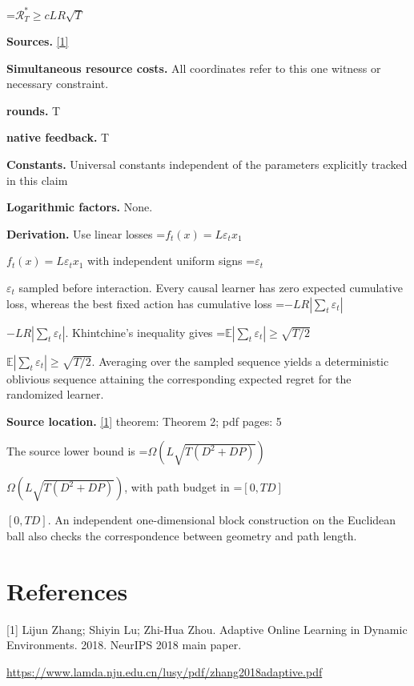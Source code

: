 \documentclass[10pt,a4paper]{article}
\newcommand{\AtlasMath}[1]{\par\begingroup\centering\setbox0=\hbox{$\displaystyle #1$}\ifdim\wd0>1.4\linewidth\typeout{ATLAS WIDE FORMULA: \the\wd0}\fi\ifdim\wd0>\linewidth\resizebox{\linewidth}{!}{\box0}\else\box0\fi\par\endgroup}
\newcommand{\AtlasInlineMath}[1]{\begingroup\setbox0=\hbox{$#1$}\ifdim\wd0>.4\linewidth\endgroup\AtlasMath{#1}\else\endgroup$#1$\fi}
\begin{document}
\AtlasMath{\mathcal{R}_T^*\ge cLR\sqrt T}
\textbf{Sources.} \href{https://www.lamda.nju.edu.cn/lusy/pdf/zhang2018adaptive.pdf}{[1]}

\textbf{Simultaneous resource costs.} All coordinates refer to this one witness or necessary constraint.

\textbf{rounds.} T

\textbf{native feedback.} T

\textbf{Constants.} Universal constants independent of the parameters explicitly tracked in this claim

\textbf{Logarithmic factors.} None.

\textbf{Derivation.} Use linear losses \AtlasInlineMath{f_t(x)=L\varepsilon_t x_1} with independent uniform signs \AtlasInlineMath{\varepsilon_t} sampled before interaction. Every causal learner has zero expected cumulative loss, whereas the best fixed action has cumulative loss \AtlasInlineMath{-LR|\sum_t\varepsilon_t|}. Khintchine's inequality gives \AtlasInlineMath{\mathbb E|\sum_t\varepsilon_t|\ge\sqrt{T/2}}. Averaging over the sampled sequence yields a deterministic oblivious sequence attaining the corresponding expected regret for the randomized learner.

\textbf{Source location.} \href{https://www.lamda.nju.edu.cn/lusy/pdf/zhang2018adaptive.pdf}{[1]} theorem: Theorem 2; pdf pages: 5

The source lower bound is \AtlasInlineMath{\Omega(L\sqrt{T(D^2+DP)})}, with path budget in \AtlasInlineMath{[0,TD]}. An independent one-dimensional block construction on the Euclidean ball also checks the correspondence between geometry and path length.

\section{References}
[1] Lijun Zhang; Shiyin Lu; Zhi-Hua Zhou. Adaptive Online Learning in Dynamic Environments. 2018. NeurIPS 2018 main paper.

\url{https://www.lamda.nju.edu.cn/lusy/pdf/zhang2018adaptive.pdf}
\end{document}
